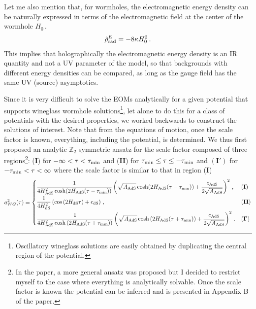 \documentclass[a4paper]{article}
\def\t{\tau}
\begin{document}
Let me also mention that, for wormholes, the electromagnetic energy density can be naturally expressed in terms of the electromagnetic field at the center of the wormhole $H_{0}$\,.
\begin{equation}\label{eq:energydensitywormhole}
    \tilde{\rho}^E_{\rm rad} = -8\kappa H_0^2\,.
\end{equation}
This implies that holographically the electromagnetic energy density is an IR quantity and not a UV parameter of the model, so that backgrounds with different energy densities can be compared, as long as the gauge field has the same UV (source) asymptotics.

Since it is very difficult to solve the EOMs analytically for a given potential that supports wineglass wormhole solutions\footnote{Oscillatory wineglass solutions are easily obtained by duplicating the central region of the potential.}, let alone to do this for a class of potentials with the desired properties, we worked backwards to construct the solutions of interest. Note that from the equations of motion, once the scale factor is known, everything, including the potential, is determined. We thus first proposed an analytic $\mathbb{Z}_2$ symmetric ansatz for the scale factor composed of three regions\footnote{In the paper, a more general ansatz was proposed but I decided to restrict myself to the case where everything is analytically solvable. Once the scale factor is known the potential can be inferred and is presented in Appendix B of the paper.}: (\textbf{I}) for $-\infty<\t<\tau_{\rm min}$ and (\textbf{II}) for $\tau_{\rm min} \leq \t \leq  - \tau_{\rm min}$ and $(\textbf{I}')$ for $-\tau_{\rm min} < \tau < \infty$ where the scale factor is similar to that in region (\textbf{I})
\begin{equation}
 a_{WG}^2(\tau) = 
    \begin{cases}
   \displaystyle   \frac{1}{4 H_{\rm AdS}^2\cosh(2H_{\rm AdS}(\tau-\tau_{\rm min}))}\left(\sqrt{A_{\rm AdS}}\cosh(2H_{\rm AdS}(\tau-\tau_{\rm min}))+\frac{c_{\rm AdS}}{2\sqrt{A_{\rm AdS}}}\right)^2\,, &  (\textbf{I})
\\[0.3cm]
   \displaystyle     \frac{1}{4 H_{\rm dS}^2} \left(\cos{(2H_{\rm dS}\tau)}+ c_{\rm dS}\right)\,, & (\textbf{II}) 
\\[0.3cm]
  \displaystyle   \frac{1}{4 H_{\rm AdS}^2\cosh{(2H_{\rm AdS}(\tau+\tau_{\rm min}))}}\left(\sqrt{A_{\rm AdS}}\cosh{(2H_{\rm AdS}(\tau+\tau_{\rm min}))}+\frac{c_{\rm AdS}}{2\sqrt{A_{\rm AdS}}}\right)^2\,. &  (\textbf{I}')
    \end{cases}
\label{eq:background_ans_simple}
\end{equation}
\end{document}
